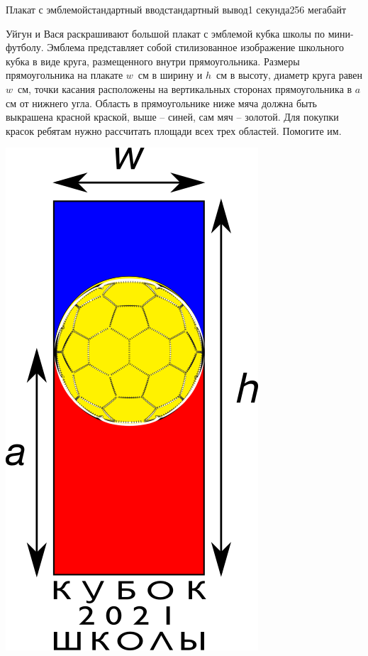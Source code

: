 \begin{problem}{Плакат с эмблемой}{стандартный ввод}{стандартный вывод}{1 секунда}{256 мегабайт}

Уйгун и Вася раскрашивают большой плакат с эмблемой кубка школы по мини-футболу. Эмблема представляет собой стилизованное изображение школьного кубка в виде круга, размещенного внутри прямоугольника. Размеры прямоугольника на плакате $w$~см в ширину и $h$~см в высоту, диаметр круга равен $w$~см, точки касания расположены на вертикальных сторонах прямоугольника в $a$ см от нижнего угла. Область в прямоугольнике ниже мяча должна быть выкрашена красной краской, выше -- синей, сам мяч -- золотой. Для покупки красок ребятам нужно рассчитать площади всех трех областей. Помогите им.

\noindent\centerline{\includegraphics{cup.png}}




\end{problem}
